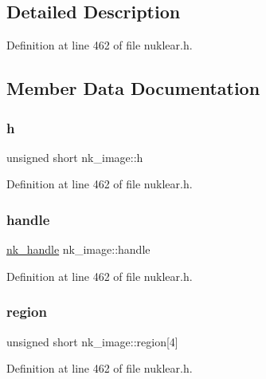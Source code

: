 \subsection{Detailed Description}


Definition at line 462 of file nuklear.\+h.



\subsection{Member Data Documentation}
\mbox{\label{structnk__image_a5d738d1061d5b9ffa1588e4d320bc3c5}} 
\subsubsection{\texorpdfstring{h}{h}}
{\footnotesize\ttfamily unsigned short nk\+\_\+image\+::h}



Definition at line 462 of file nuklear.\+h.

\mbox{\label{structnk__image_ac8489fd68c4b2228eecdd017353ccf40}} 
\subsubsection{\texorpdfstring{handle}{handle}}
{\footnotesize\ttfamily \mbox{\hyperlink{unionnk__handle}{nk\+\_\+handle}} nk\+\_\+image\+::handle}



Definition at line 462 of file nuklear.\+h.

\mbox{\label{structnk__image_a0558f88dc25def97650d525d65429674}} 
\subsubsection{\texorpdfstring{region}{region}}
{\footnotesize\ttfamily unsigned short nk\+\_\+image\+::region\mbox{[}4\mbox{]}}



Definition at line 462 of file nuklear.\+h.

